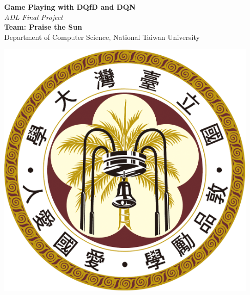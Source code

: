 \documentclass[a0,portrait]{a0poster}
\begin{document}


\begin{minipage}[b]{0.75\linewidth}
\veryHuge \color{NavyBlue} \textbf{Game Playing with DQfD and DQN} \color{Black}\\ %
\Huge\textit{ADL Final Project}\\[2cm] %
\huge \textbf{Team: Praise the Sun}\\[0.5cm] %
\huge Department of Computer Science, National Taiwan University\\[0.4cm] %
\end{minipage}
%
\begin{minipage}[b]{0.25\linewidth}
\includegraphics[width=12.5cm]{ntu_logo.png}\\
\end{minipage}
\end{document}
